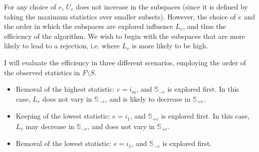 \documentclass[11pt,a4paper,openright,twoside]{article}
\begin{document}
For any choice of $e$, $U_v$ does not increase in the subspaces (since it is defined by taking the maximum statistics over smaller subsets). However, the choice of $e$ and the order in which the subspaces are explored influence $L_v$, and thus the efficiency of the algorithm. We wish to begin with the subspaces that are more likely to lead to a rejection, i.e. where $L_v$ is more likely to be high.

I will evaluate the efficiency in three different scenarios, employing the order of the observed statistics in $F\setminus S$.
\begin{itemize}
\item Removal of the highest statistic: $e=i_m$, and $\mathbb{S}_{-e}$ is explored first. In this case, $L_v$ does not vary in $\mathbb{S}_{-e}$, and is likely to decrease in $\mathbb{S}_{+e}$.
\item Keeping of the lowest statistic: $e=i_1$, and $\mathbb{S}_{+e}$ is explored first. In this case, $L_v$ may decrease in $\mathbb{S}_{-e}$, and does not vary in $\mathbb{S}_{+e}$.
\item Removal of the lowest statistic: $e=i_1$, and $\mathbb{S}_{-e}$ is explored first.
\end{itemize}
\end{document}
